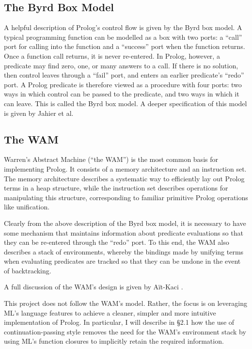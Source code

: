 \documentclass[12pt]{article}
\begin{document}
\subsection{The Byrd Box Model}

A helpful description of Prolog's control flow is given by the Byrd box model. 
A typical programming function can be modelled as a box with two ports: a ``call'' port for calling into the function and a ``success'' port when the function returns. 
Once a function call returns, it is never re-entered.
In Prolog, however, a predicate may find zero, one, or many answers to a call. 
If there is no solution, then control leaves through a ``fail'' port, and enters an earlier predicate's ``redo'' port.
A Prolog predicate is therefore viewed as a procedure with four ports: two ways in which control can be passed to the predicate, and two ways in which it can leave.
This is called the Byrd box model.
A deeper specification of this model is given by Jahier et al. \cite{byrd00}

\subsection{The WAM}

Warren's Abstract Machine (``the WAM'') is the most common basis for implementing Prolog. 
It consists of a memory architecture and an instruction set. 
The memory architecture describes a systematic way to efficiently lay out Prolog terms in a heap structure, while the instruction set describes operations for manipulating this structure, corresponding to familiar primitive Prolog operations like unification. 

Clearly from the above description of the Byrd box model, it is necessary to have some mechanism that maintains information about predicate evaluations so that they can be re-entered through the ``redo'' port. 
To this end, the WAM also describes a stack of environments, whereby the bindings made by unifying terms when evaluating predicates are tracked so that they can be undone in the event of backtracking. 

A full discussion of the WAM's design is given by A\"it-Kaci \cite{wam91}.

This project does not follow the WAM's model. 
Rather, the focus is on leveraging ML's language features to achieve a cleaner, simpler and more intuitive implementation of Prolog. 
In particular, I will describe in \S2.1 how the use of continuation-passing style removes the need for the WAM's environment stack by using ML's function closures to implicitly retain the required information.
\end{document}
